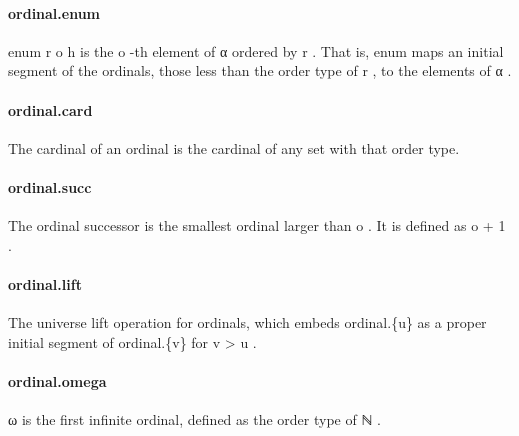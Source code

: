 \documentclass{article}
\begin{document}
\paragraph{ordinal.enum}
\par
\colorbox[RGB]{253,246,227}{{{{\color[RGB]{101, 123, 131} enum r o h }}}} is the 
\colorbox[RGB]{253,246,227}{{{{\color[RGB]{101, 123, 131} o }}}}-th element of 
\colorbox[RGB]{253,246,227}{{{{\color[RGB]{101, 123, 131} α }}}} ordered by 
\colorbox[RGB]{253,246,227}{{{{\color[RGB]{101, 123, 131} r }}}}.
That is, 
\colorbox[RGB]{253,246,227}{{{{\color[RGB]{101, 123, 131} enum }}}} maps an initial segment of the ordinals, those
less than the order type of 
\colorbox[RGB]{253,246,227}{{{{\color[RGB]{101, 123, 131} r }}}}, to the elements of 
\colorbox[RGB]{253,246,227}{{{{\color[RGB]{101, 123, 131} α }}}}.
\paragraph{ordinal.card}
\par
The cardinal of an ordinal is the cardinal of any
set with that order type.
\paragraph{ordinal.succ}
\par
The ordinal successor is the smallest ordinal larger than 
\colorbox[RGB]{253,246,227}{{{{\color[RGB]{101, 123, 131} o }}}}.
It is defined as 
\colorbox[RGB]{253,246,227}{{{{\color[RGB]{101, 123, 131} o  }}}{{{\color[RGB]{181, 137, 0} + }}}{{{\color[RGB]{101, 123, 131}   }}}{{{\color[RGB]{108, 113, 196} 1 }}}}.
\paragraph{ordinal.lift}
\par
The universe lift operation for ordinals, which embeds 
\colorbox[RGB]{253,246,227}{{{{\color[RGB]{101, 123, 131} ordinal.\{u\} }}}} as
a proper initial segment of 
\colorbox[RGB]{253,246,227}{{{{\color[RGB]{101, 123, 131} ordinal.\{v\} }}}} for 
\colorbox[RGB]{253,246,227}{{{{\color[RGB]{101, 123, 131} v  }}}{{{\color[RGB]{181, 137, 0} > }}}{{{\color[RGB]{101, 123, 131}  u }}}}.
\paragraph{ordinal.omega}
\par
\colorbox[RGB]{253,246,227}{{{{\color[RGB]{101, 123, 131} ω }}}} is the first infinite ordinal, defined as the order type of 
\colorbox[RGB]{253,246,227}{{{{\color[RGB]{101, 123, 131} ℕ }}}}.
\end{document}
